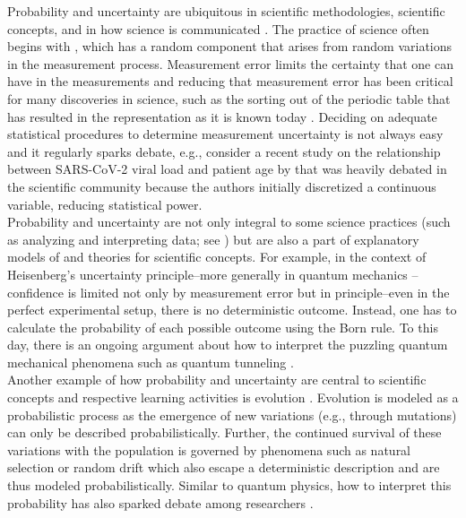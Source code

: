 \documentclass[man, floatsintext]{apa7} %
\begin{document}
Probability and uncertainty are ubiquitous in scientific methodologies, scientific concepts, and in how science is communicated \parencite{gsoobmc17}. The practice of science often begins with , which has a random component \parencite{fuller2009measurement} that arises from random variations in the measurement process. Measurement error limits the certainty that one can have in the measurements and reducing that measurement error has been critical for many discoveries in science, such as the sorting out of the periodic table that has resulted in the representation as it is known today \parencite{fco15}. Deciding on adequate statistical procedures to determine measurement uncertainty is not always easy and it regularly sparks debate, e.g., consider a recent study on the relationship between SARS-CoV-2 viral load and patient age by \textcite{jmvbzhd20} that was heavily debated in the scientific community \parencite{frick_peer-review_2020} because the authors initially discretized a continuous variable, reducing statistical power. \\

Probability and uncertainty are not only integral to some science practices (such as analyzing and interpreting data; see \textcite[]{nrc12}) but are also a part of explanatory models of and theories for scientific concepts. For example, in the context of Heisenberg’s uncertainty principle--more generally in quantum mechanics \parencite{feynman1951operator}--confidence is limited not only by measurement error but in principle--even in the perfect experimental setup, there is no deterministic outcome. Instead, one has to calculate the probability of each possible outcome using the Born rule. To this day, there is an ongoing argument about how to interpret the puzzling quantum mechanical phenomena such as quantum tunneling \parencite{c19}. \\

Another example of how probability and uncertainty are central to scientific concepts and respective learning activities is evolution \parencite{fsnh19}. Evolution is modeled as a probabilistic process as the emergence of new variations (e.g., through mutations) can only be described probabilistically. Further, the continued survival of these variations with the population is governed by phenomena such as natural selection or random drift which also escape a deterministic description and are thus modeled probabilistically. Similar to quantum physics, how to interpret this probability has also sparked debate among researchers \parencite{m16}. \\
\end{document}
